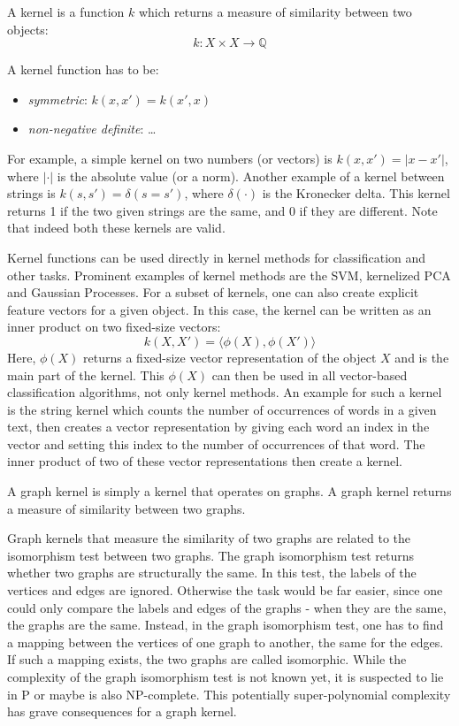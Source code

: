 A kernel is a function $k$ which returns a measure of similarity between two objects:
\begin{equation*}
k: X \times X \rightarrow \mathbb{Q}
\end{equation*}

A kernel function has to be:
\begin{itemize}
    \item{\textit{symmetric}: $k(x, x') = k(x', x)$}
    \item{\textit{non-negative definite}: \dots}
\end{itemize}

For example, a simple kernel on two numbers (or vectors) is $k(x, x') = | x - x' |$, where $| \cdot |$ is the absolute value (or a norm).
Another example of a kernel between strings is $k(s, s') = \delta(s = s')$, where $\delta(\cdot)$ is the Kronecker delta. This kernel returns 1 if the two given strings are the same, and 0 if they are different.
Note that indeed both these kernels are valid.

Kernel functions can be used directly in kernel methods for classification and other tasks.
Prominent examples of kernel methods are the SVM, kernelized PCA and Gaussian Processes. For a subset of kernels, one can also create explicit feature vectors for a given object. In this case, the kernel can be written as an inner product on two fixed-size vectors:
\begin{equation*}
    k(X, X') = \langle \phi(X), \phi(X') \rangle
\end{equation*}
Here, $\phi(X)$ returns a fixed-size vector representation of the object $X$ and is the main part of the kernel.
This $\phi(X)$ can then be used in all vector-based classification algorithms, not only kernel methods.
An example for such a kernel is the string kernel which counts the number of occurrences of words in a given text, then creates a vector representation by giving each word an index in the vector and setting this index to the number of occurrences of that word. The inner product of two of these vector representations then create a kernel.

A graph kernel is simply a kernel that operates on graphs. A graph kernel returns a measure of similarity between two graphs.

Graph kernels that measure the similarity of two graphs are related to the isomorphism test between two graphs.
The graph isomorphism test returns whether two graphs are structurally the same.
In this test, the labels of the vertices and edges are ignored. Otherwise the task would be far easier, since one could only compare the labels and edges of the graphs - when they are the same, the graphs are the same.
Instead, in the graph isomorphism test, one has to find a mapping between the vertices of one graph to another, the same for the edges.
If such a mapping exists, the two graphs are called isomorphic.
While the complexity of the graph isomorphism test is not known yet, it is suspected to lie in P or maybe is also NP-complete. This potentially super-polynomial complexity has grave consequences for a graph kernel.

